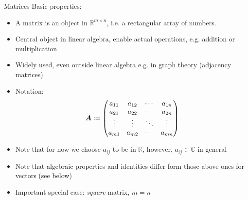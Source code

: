 \begin{frame}{Matrices}
    Basic properties:
    \begin{itemize}
        \item A matrix is an object in $\mathbb{R}^{m \times n}$, i.e. a rectangular array of numbers.
        \item Central object in linear algebra, enable actual operations, e.g. addition or multiplication
        \item Widely used, even outside linear algebra e.g. in graph theory (adjacency matrices)
        \item Notation:
              $$ \bm{A} := \begin{pmatrix}
                      a_{11} & a_{12} & \cdots & a_{1n} \\
                      a_{21} & a_{22} & \cdots & a_{2n} \\
                      \vdots & \vdots & \ddots & \vdots \\
                      a_{m1} & a_{m2} & \cdots & a_{mn}
                  \end{pmatrix}
              $$
        \item Note that for now we choose $a_{ij}$ to be in $\mathbb{R}$, however, $a_{ij} \in \mathbb{C}$ in general
        \item Note that algebraic properties and identities differ form those above ones for vectors (see below)
        \item Important special case: \emph{square} matrix, $m = n$
    \end{itemize}
\end{frame}


